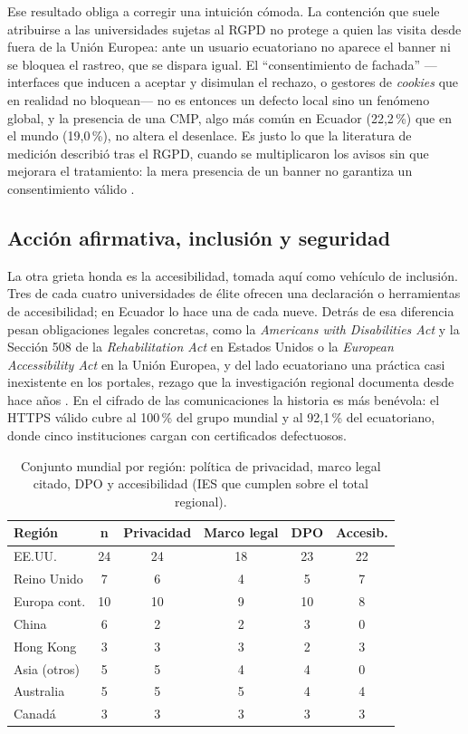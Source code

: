 \documentclass[11pt,a4paper]{article}
\begin{document}
Ese resultado obliga a corregir una intuición cómoda. La contención que suele atribuirse a las universidades sujetas al RGPD no protege a quien las visita desde fuera de la Unión Europea: ante un usuario ecuatoriano no aparece el banner ni se bloquea el rastreo, que se dispara igual. El ``consentimiento de fachada'' ---interfaces que inducen a aceptar y disimulan el rechazo, o gestores de \emph{cookies} que en realidad no bloquean--- no es entonces un defecto local sino un fenómeno global, y la presencia de una CMP, algo más común en Ecuador (22,2\,\%) que en el mundo (19,0\,\%), no altera el desenlace. Es justo lo que la literatura de medición describió tras el RGPD, cuando se multiplicaron los avisos sin que mejorara el tratamiento: la mera presencia de un banner no garantiza un consentimiento válido \citep{degeling2019value,kretschmer2021cookie,nouwens2020dark,gray2021dark,habib2022okay}.

\subsection{Acci\'on afirmativa, inclusi\'on y seguridad}
La otra grieta honda es la accesibilidad, tomada aquí como vehículo de inclusión. Tres de cada cuatro universidades de élite ofrecen una declaración o herramientas de accesibilidad; en Ecuador lo hace una de cada nueve. Detrás de esa diferencia pesan obligaciones legales concretas, como la \emph{Americans with Disabilities Act} \citep{ada1990} y la Sección 508 de la \emph{Rehabilitation Act} \citep{section508} en Estados Unidos o la \emph{European Accessibility Act} \citep{eaa2019} en la Unión Europea, y del lado ecuatoriano una práctica casi inexistente en los portales, rezago que la investigación regional documenta desde hace años \citep{campoverdemolina2023accessibility,acostavargas2020dataset}. En el cifrado de las comunicaciones la historia es más benévola: el HTTPS válido cubre al 100\,\% del grupo mundial y al 92,1\,\% del ecuatoriano, donde cinco instituciones cargan con certificados defectuosos.

\begin{table}[htbp]
	\centering
	\caption{Conjunto mundial por regi\'on: pol\'itica de privacidad, marco legal citado, DPO y accesibilidad (IES que cumplen sobre el total regional).}
	\label{tab:reg}
	\small
	\begin{tabular}{@{}lccccc@{}}
		\toprule
		\textbf{Regi\'on} & \textbf{n} & \textbf{Privacidad} & \textbf{Marco legal} & \textbf{DPO} & \textbf{Accesib.} \\
		\midrule
	EE.UU. & 24 & 24 & 18 & 23 & 22 \\
	Reino Unido & 7 & 6 & 4 & 5 & 7 \\
	Europa cont. & 10 & 10 & 9 & 10 & 8 \\
	China & 6 & 2 & 2 & 3 & 0 \\
	Hong Kong & 3 & 3 & 3 & 2 & 3 \\
	Asia (otros) & 5 & 5 & 4 & 4 & 0 \\
	Australia & 5 & 5 & 5 & 4 & 4 \\
	Canadá & 3 & 3 & 3 & 3 & 3 \\
		\bottomrule
	\end{tabular}
\end{table}
\end{document}
